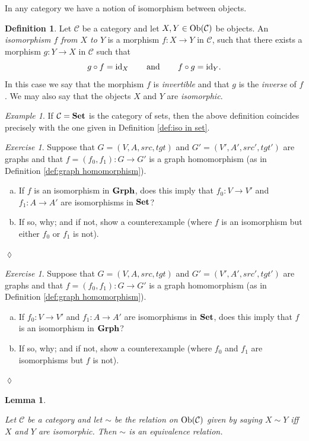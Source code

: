 \documentclass{book}
\def\tn{\textnormal}
\def\mc{\mathcal}
\def\Ob{\tn{Ob}}
\def\hsp{\hspace{.3in}}
\def\to{\rightarrow}
\def\taking{\colon}
\def\id{\tn{id}}
\def\Grph{{\bf Grph}}
\def\Set{{\bf Set}}
\def\mcC{\mc{C}}
\newtheorem{lemma}[subsubsection]{Lemma}
\theoremstyle{remark}
\newtheorem{example}[subsubsection]{Example}
\newtheorem{exc}[subsubsection]{Exercise}
\newenvironment{exercise}{\begin{exc}}{\hspace*{\fill}$\lozenge$\end{exc}}
\theoremstyle{definition}
\newtheorem{definition}[subsubsection]{Definition}
\def\sexc{\begin{enumerate}[a.)]\setlength{\itemsep}{.1cm}\setlength{\parskip}{.1cm}\item}
\def\next{\item}
\def\endsexc{\end{enumerate}}
\begin{document}
In any category we have a notion of isomorphism between objects.

\begin{definition}

Let $\mcC$ be a category and let $X,Y\in\Ob(\mcC)$ be objects. An {\em isomorphism $f$ from $X$ to $Y$} is a morphism $f\taking X\to Y$ in $\mcC$, such that there exists a morphism $g\taking Y\to X$ in $\mcC$ such that $$g\circ f=\id_X\hsp\tn{and}\hsp f\circ g=\id_Y.$$ In this case we say that the morphism $f$ is {\em invertible} and that $g$ is the {\em inverse} of $f$. We may also say that the objects $X$ and $Y$ are {\em isomorphic}.

\end{definition}

\begin{example}

If $\mcC=\Set$ is the category of sets, then the above definition coincides precisely with the one given in Definition \ref{def:iso in set}.

\end{example}

\begin{exercise}
Suppose that $G=(V,A,src,tgt)$ and $G'=(V',A',src',tgt')$ are graphs and that $f=(f_0,f_1)\taking G\to G'$ is a graph homomorphism (as in Definition \ref{def:graph homomorphism}). 
\sexc If $f$ is an isomorphism in $\Grph$, does this imply that $f_0\taking V\to V'$ and $f_1\taking A\to A'$ are isomorphisms in $\Set$?
\next  If so, why; and if not, show a counterexample (where $f$ is an isomorphism but either $f_0$ or $f_1$ is not).
\endsexc
\end{exercise}

\begin{exercise}
Suppose that $G=(V,A,src,tgt)$ and $G'=(V',A',src',tgt')$ are graphs and that $f=(f_0,f_1)\taking G\to G'$ is a graph homomorphism (as in Definition \ref{def:graph homomorphism}). 
\sexc If $f_0\taking V\to V'$ and $f_1\taking A\to A'$ are isomorphisms in $\Set$, does this imply that $f$ is an isomorphism in $\Grph$?
\next If so, why; and if not, show a counterexample (where $f_0$ and $f_1$ are isomorphisms but $f$ is not).
\endsexc
\end{exercise}

\begin{lemma}\label{lemma:isomorphic ER}

Let $\mcC$ be a category and let $\sim$ be the relation on $\Ob(\mcC)$ given by saying $X\sim Y$ iff $X$ and $Y$ are isomorphic. Then $\sim$ is an equivalence relation.

\end{lemma}
\end{document}
